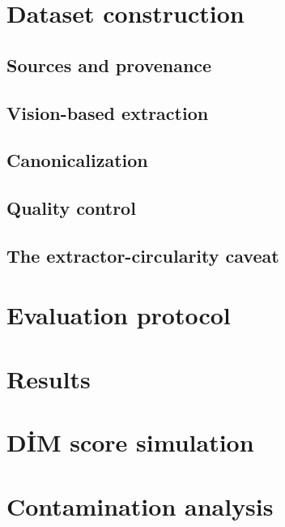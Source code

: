 \documentclass[11pt]{article}
\begin{document}
\section{Dataset construction}
\subsection{Sources and provenance}      %
\subsection{Vision-based extraction}     %
\subsection{Canonicalization}            %
\subsection{Quality control}             %
\subsection{The extractor-circularity caveat}  %

\section{Evaluation protocol}

\section{Results}

\section{D\.IM score simulation}

\section{Contamination analysis}
\end{document}
